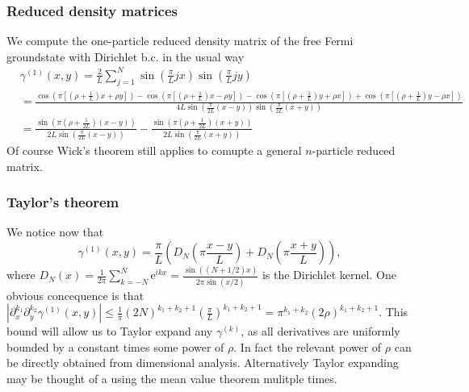 \documentclass[a4paper,11pt]{article}
\newcommand{\euler}[1]{\text{e}^{#1}}
\newcommand{\abs}[1]{\left\lvert #1 \right\rvert}
\numberwithin{equation}{section}
\begin{document}
	\subsubsection{Reduced density matrices}
	We compute the one-particle reduced density matrix of the free Fermi groundstate with Dirichlet b.c. in the usual way\begin{equation}
	\begin{aligned}
	&\gamma^{(1)}(x,y)=\frac{2}{L}\sum_{j=1}^{N}\sin\left(\frac{\pi}{L}jx\right)\sin\left(\frac{\pi}{L} jy\right)\\
	&=\frac{\cos\left(\pi\left[ \left(\rho+\frac{1}{L}\right)x+\rho y\right]\right)-\cos\left(\pi \left[\left(\rho+\frac{1}{L}\right)x-\rho y\right]\right)-\cos\left(\pi \left[\left(\rho+\frac{1}{L}\right)y+\rho x\right]\right)+\cos\left(\pi \left[\left(\rho+\frac{1}{L}\right)y-\rho x\right]\right)}{4L\sin\left(\frac{\pi}{2L}(x-y)\right)\sin\left(\frac{\pi}{2L}(x+y)\right)}\\
	&=\frac{\sin\left(\pi\left(\rho+\frac{1}{2L}\right)(x-y)\right)}{2L\sin\left(\frac{\pi}{2L}(x-y)\right)}-\frac{\sin\left(\pi\left(\rho+\frac{1}{2L}\right)(x+y)\right)}{2L\sin\left(\frac{\pi}{2L}(x+y)\right)}
	\end{aligned}
	\end{equation}
	Of course Wick's theorem still applies to comupte a general $ n $-particle reduced matrix.
	\subsubsection{Taylor's theorem}
	We notice now that \begin{equation}
	\gamma^{(1)}(x,y)=\frac{\pi}{L}\left(D_{N}\left(\pi\frac{x-y}{L}\right)+D_{N}\left(\pi\frac{x+y}{L}\right)\right),
	\end{equation}
	where $ D_N(x)=\frac{1}{2\pi}\sum_{k=-N}^{N}\euler{ikx}=\frac{\sin((N+1/2)x)}{2\pi\sin(x/2)} $ is the Dirichlet kernel. One obvious concequence is that $ \abs{\partial_{x}^{k_1}\partial_{y}^{k_2}\gamma^{(1)}(x,y)}\leq \frac{1}{\pi}(2N)^{k_1+k_2+1}\left(\frac{\pi}{L}\right)^{k_1+k_2+1}=\pi^{k_1+k_2}(2\rho)^{k_1+k_2+1} $. This bound will allow us to Taylor expand any $ \gamma^{(k)} $, as all derivatives are uniformly bounded by a constant times some power of $ \rho $. In fact the relevant power of $ \rho $ can be directly obtained from dimensional analysis. Alternatively Taylor expanding may be thought of a using the mean value theorem mulitple times.
\end{document}
